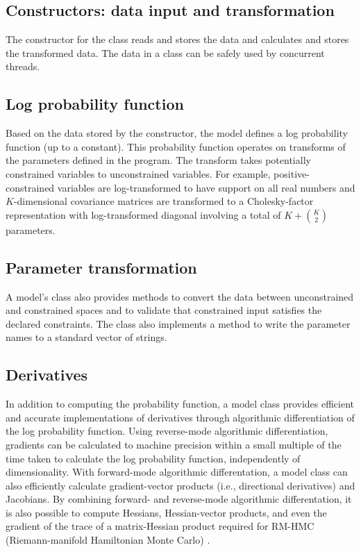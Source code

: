 \documentclass[article]{jss}
\begin{document}
\subsection{Constructors: data input and transformation} 

The constructor for the class reads and stores the data and calculates
and stores the transformed data.  The data in a class can be safely
used by concurrent threads.

\subsection{Log probability function}

Based on the data stored by the constructor, the model defines a log
probability function (up to a constant).  This probability function
operates on transforms of the parameters defined in the program.  The
transform takes potentially constrained variables to unconstrained
variables.  For example, positive-constrained variables are
log-transformed to have support on all real numbers and
$K$-dimensional covariance matrices are transformed to a
Cholesky-factor representation with log-transformed diagonal involving
a total of $K + {K \choose 2}$ parameters.

\subsection{Parameter transformation}

A model's class also provides methods to convert the data between
unconstrained and constrained spaces and to validate that constrained
input satisfies the declared constraints.  The class also implements a
method to write the parameter names to a standard vector of strings.

\subsection{Derivatives}

In addition to computing the probability function, a model class
provides efficient and accurate implementations of derivatives through
algorithmic differentiation of the log probability function.  Using
reverse-mode algorithmic differentiation, gradients can be calculated
to machine precision within a small multiple of the time taken to
calculate the log probability function, independently of
dimensionality.  With forward-mode algorithmic differentation, a model
class can also efficiently calculate gradient-vector products (i.e.,
directional derivatives) and Jacobians. By combining forward- and
reverse-mode algorithmic differentation, it is also possible to
compute Hessians, Hessian-vector products, and even the gradient of
the trace of a matrix-Hessian product required for RM-HMC
(Riemann-manifold Hamiltonian Monte Carlo)
\citep{Betancourt-softabs:??}.
\end{document}
